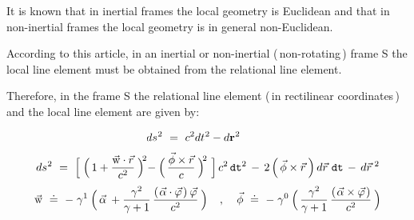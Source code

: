 \documentclass[10pt,fleqn]{article}
\begin{document}
\vspace{-0.6em}

\par {}

\bigskip \smallskip

\noindent It is known that in inertial frames the local geometry is Euclidean and that in non-inertial frames the local geometry is in general non-Euclidean.
\par \medskip \smallskip
\noindent According to this article, in an inertial or non-inertial (\,non-rotating\,) frame S the local line element must be obtained from the relational line element.
\par \medskip \smallskip
\noindent Therefore, in the frame S the relational line element (\,in rectilinear coordinates\,) and the local line element are given by:
\par \vspace{+0.06em}
\begin{eqnarray*}
\hspace{-2.50em} ds^{\hspace{+0.03em}2} ~=~ c^2 dt^{\hspace{+0.03em}2} - d\mathbf{r}^{\hspace{+0.03em}2}
\end{eqnarray*}
\vspace{-0.45em}
\begin{eqnarray*}
ds^{\hspace{+0.03em}2} ~=~ \Big [ \; \Big ( \, 1 + \frac{\vec{\mathrm w} \cdot \vec{r}}{c^2} \: \Big )^{\hspace{-0.18em}2} \hspace{-0.21em}- \Big ( \, \frac{\vec{\phi} \times \vec{r}}{c} \: \Big )^{\hspace{-0.18em}2} \,\, \Big ] \, c^2 \, \mathtt{dt}^2 \,-\, 2 \, \Big ( \, \vec{\phi} \times \vec{r} \: \Big ) \, d\vec{r} \,\, \mathtt{dt} \,-\, d\vec{r}^{\hspace{+0.24em}2}
\end{eqnarray*}
\vspace{+0.06em}
\begin{eqnarray*}
\hspace{+0.03em} \vec{\mathrm w} ~\doteq~ - \; \gamma^1 \: \Big ( \, \vec{\alpha} \: + \frac{\gamma^2}{\gamma + 1} \, \frac{(\hspace{+0.09em} \vec{\alpha} \cdot \vec{\varphi} \hspace{+0.09em}) \: \vec{\varphi}}{c^2} \: \Big ) \hspace{+1.08em} , \hspace{+1.08em} \vec{\phi} ~\doteq~ - \; \gamma^0 \: \Big ( \, \frac{\gamma^2}{\gamma + 1} \, \frac{(\hspace{+0.09em} \vec{\alpha} \times \vec{\varphi} \hspace{+0.09em})}{c^2} \: \Big )
\end{eqnarray*}
\end{document}
